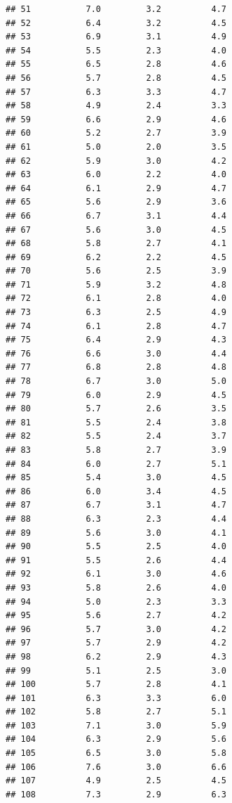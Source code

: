 \documentclass[
]{book}
\begin{document}
\begin{verbatim}
## 51           7.0         3.2          4.7
## 52           6.4         3.2          4.5
## 53           6.9         3.1          4.9
## 54           5.5         2.3          4.0
## 55           6.5         2.8          4.6
## 56           5.7         2.8          4.5
## 57           6.3         3.3          4.7
## 58           4.9         2.4          3.3
## 59           6.6         2.9          4.6
## 60           5.2         2.7          3.9
## 61           5.0         2.0          3.5
## 62           5.9         3.0          4.2
## 63           6.0         2.2          4.0
## 64           6.1         2.9          4.7
## 65           5.6         2.9          3.6
## 66           6.7         3.1          4.4
## 67           5.6         3.0          4.5
## 68           5.8         2.7          4.1
## 69           6.2         2.2          4.5
## 70           5.6         2.5          3.9
## 71           5.9         3.2          4.8
## 72           6.1         2.8          4.0
## 73           6.3         2.5          4.9
## 74           6.1         2.8          4.7
## 75           6.4         2.9          4.3
## 76           6.6         3.0          4.4
## 77           6.8         2.8          4.8
## 78           6.7         3.0          5.0
## 79           6.0         2.9          4.5
## 80           5.7         2.6          3.5
## 81           5.5         2.4          3.8
## 82           5.5         2.4          3.7
## 83           5.8         2.7          3.9
## 84           6.0         2.7          5.1
## 85           5.4         3.0          4.5
## 86           6.0         3.4          4.5
## 87           6.7         3.1          4.7
## 88           6.3         2.3          4.4
## 89           5.6         3.0          4.1
## 90           5.5         2.5          4.0
## 91           5.5         2.6          4.4
## 92           6.1         3.0          4.6
## 93           5.8         2.6          4.0
## 94           5.0         2.3          3.3
## 95           5.6         2.7          4.2
## 96           5.7         3.0          4.2
## 97           5.7         2.9          4.2
## 98           6.2         2.9          4.3
## 99           5.1         2.5          3.0
## 100          5.7         2.8          4.1
## 101          6.3         3.3          6.0
## 102          5.8         2.7          5.1
## 103          7.1         3.0          5.9
## 104          6.3         2.9          5.6
## 105          6.5         3.0          5.8
## 106          7.6         3.0          6.6
## 107          4.9         2.5          4.5
## 108          7.3         2.9          6.3

\end{verbatim}
\end{document}
